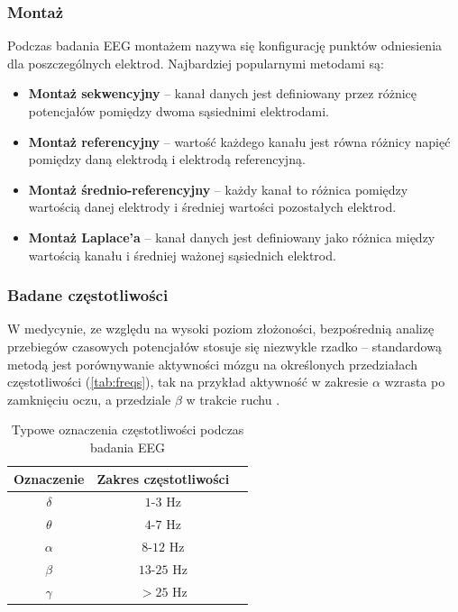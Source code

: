 \documentclass{./assets/wfis}
\begin{document}
\subsubsection{Montaż}
Podczas badania EEG montażem nazywa się konfigurację punktów odniesienia dla poszczególnych elektrod. Najbardziej popularnymi metodami są:
\begin{itemize}
    \item \textbf{Montaż sekwencyjny} – kanał danych jest definiowany przez różnicę potencjałów pomiędzy dwoma sąsiednimi elektrodami.
    \item \textbf{Montaż referencyjny} – wartość każdego kanału jest równa różnicy napięć pomiędzy daną elektrodą i elektrodą referencyjną.
    \item \textbf{Montaż średnio-referencyjny} – każdy kanał to różnica pomiędzy wartością danej elektrody i średniej wartości pozostałych elektrod. 
    \item \textbf{Montaż Laplace’a} – kanał danych jest definiowany jako różnica między wartością kanału i średniej ważonej sąsiednich elektrod.
\end{itemize}


\subsubsection{Badane częstotliwości}

W medycynie, ze względu na wysoki poziom złożoności, bezpośrednią analizę przebiegów czasowych potencjałów stosuje się niezwykle rzadko – standardową metodą jest porównywanie aktywności mózgu na określonych przedziałach częstotliwości (\autoref{tab:freqs}), tak na przykład aktywność w zakresie $\alpha$ wzrasta po zamknięciu oczu, a przedziale $\beta$ w trakcie ruchu \cite{britton_electroencephalography_2016}. 

\begin{table}[h]
    \centering
    \begin{tabular}{|c|c|c|}
        \hline
        Oznaczenie & Zakres częstotliwości \\
        \hline
        $\delta$ & $1$-$3$ Hz  \\
        $\theta$ & $4$-$7$ Hz \\
        $\alpha$ & $8$-$12$ Hz \\
        $\beta$  & $13$-$25$ Hz \\
        $\gamma$ & $>25$ Hz \\
        \hline
    \end{tabular}
    \caption{Typowe oznaczenia częstotliwości podczas badania EEG}
    \label{tab:freqs}
\end{table}
\end{document}
